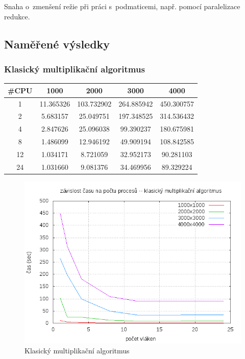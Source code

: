 \documentclass[12pt,a4paper]{article}
\begin{document}
Snaha o~zmenšení režie při práci s~podmaticemi, např. pomocí paralelizace redukce.




\pagebreak
\subsection{Naměřené výsledky}


\subsubsection{Klasický multiplikační algoritmus}


\begin{center}
\begin{tabular}{ | c || c | c | c | c | }
\hline
\#CPU    &   1000		&	2000	&	3000	&	4000	\\
\hline
\hline
1    &   11.365326		&	103.732902	&	264.885942 	& 450.300757 	\\ \hline
2    &   5.683157		&	25.049751	&	197.348525 	& 314.536432 	\\ \hline
4    &   2.847626		&	25.096038	&	99.390237 	& 180.675981 	 \\	 \hline
8    &   1.486099		&	12.946192	&	49.909194 	& 108.842585	\\	 \hline
12   &   1.034171		&	8.721059 	&	32.952173	& 90.281103 	\\	 \hline
24   &   1.031660		&	9.081376	&	34.469956	& 89.329224  	\\ \hline
\end{tabular}
\end{center}

\pagebreak
\begin{figure}[h]
\includegraphics[width=\textwidth]{graph/classic.png}
\caption{Klasický multiplikační algoritmus}
\label{data4}
\end{figure}
\end{document}
